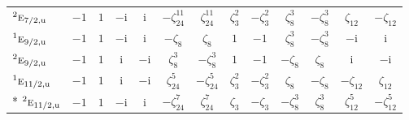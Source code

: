 \documentclass[10pt,a4paper]{article}
\numberwithin{equation}{section}
\newcommand{\irr}[1]{\text{\normalfont\scshape #1}}
\newcommand{\conjpair}[1]{{}^{#1}}
\newcommand{\ptag}[1]{\mathrm{#1}}
\newcommand{\iunit}{\mathrm{i}}
\newcommand{\rootunity}[1]{\zeta_{#1}}
\begin{document}
{\begin{longtable}{@{}lcccccccccccc@{}}
$\conjpair{2}\irr{e}_{7/2,\ptag{u}}$ & $-1$ & $1$ & $-\iunit{}$ & $\iunit{}$ & $-\rootunity{24}^{11}$ & $\rootunity{24}^{11}$ & $\rootunity{3}^{2}$ & $-\rootunity{3}^{2}$ & $\rootunity{8}^{3}$ & $-\rootunity{8}^{3}$ & $\rootunity{12}$ & $-\rootunity{12}$\\
$\conjpair{1}\irr{e}_{9/2,\ptag{u}}$ & $-1$ & $1$ & $-\iunit{}$ & $\iunit{}$ & $-\rootunity{8}$ & $\rootunity{8}$ & $1$ & $-1$ & $\rootunity{8}^{3}$ & $-\rootunity{8}^{3}$ & $-\iunit{}$ & $\iunit{}$\\
$\conjpair{2}\irr{e}_{9/2,\ptag{u}}$ & $-1$ & $1$ & $\iunit{}$ & $-\iunit{}$ & $\rootunity{8}^{3}$ & $-\rootunity{8}^{3}$ & $1$ & $-1$ & $-\rootunity{8}$ & $\rootunity{8}$ & $\iunit{}$ & $-\iunit{}$\\
$\conjpair{1}\irr{e}_{11/2,\ptag{u}}$ & $-1$ & $1$ & $\iunit{}$ & $-\iunit{}$ & $\rootunity{24}^{5}$ & $-\rootunity{24}^{5}$ & $\rootunity{3}^{2}$ & $-\rootunity{3}^{2}$ & $\rootunity{8}$ & $-\rootunity{8}$ & $-\rootunity{12}$ & $\rootunity{12}$\\*
$\conjpair{2}\irr{e}_{11/2,\ptag{u}}$ & $-1$ & $1$ & $-\iunit{}$ & $\iunit{}$ & $-\rootunity{24}^{7}$ & $\rootunity{24}^{7}$ & $\rootunity{3}$ & $-\rootunity{3}$ & $-\rootunity{8}^{3}$ & $\rootunity{8}^{3}$ & $\rootunity{12}^{5}$ & $-\rootunity{12}^{5}$\\
\bottomrule\end{longtable}}
\end{document}
